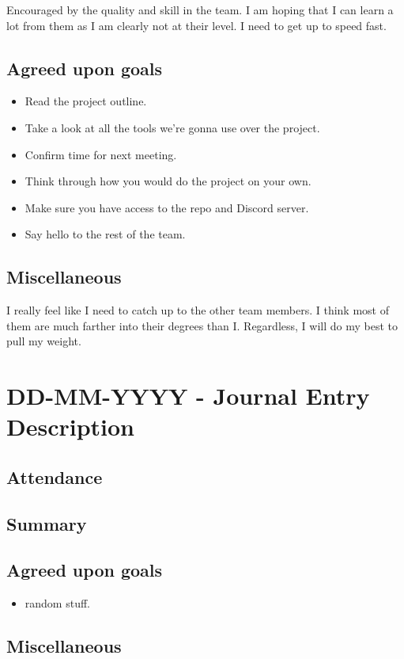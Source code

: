 \documentclass[12pt]{article}
\begin{document}
	Encouraged by the quality and skill in the team. I am hoping that I can learn a lot from them as I am clearly not at their level. I need to get up to speed fast.
	
	\subsection{Agreed upon goals}
	\begin{itemize}
		\item Read the project outline.
		\item Take a look at all the tools we're gonna use over the project.
		\item Confirm time for next meeting.
		\item Think through how you would do the project on your own. 
		\item Make sure you have access to the repo and Discord server. 
		\item Say hello to the rest of the team.
	\end{itemize}
	
	\subsection{Miscellaneous}
	I really feel like I need to catch up to the other team members. I think most of them are much farther into their degrees than I. Regardless, I will do my best to pull my weight.
	
	\pagebreak
	
	\section{DD-MM-YYYY - Journal Entry Description}
	
	\subsection{Attendance}
	
	\subsection{Summary}
	
	\subsection{Agreed upon goals}
	\begin{itemize}
		\item random stuff.
	\end{itemize}
	
	\subsection{Miscellaneous}
	
	\pagebreak
	
\end{document}
